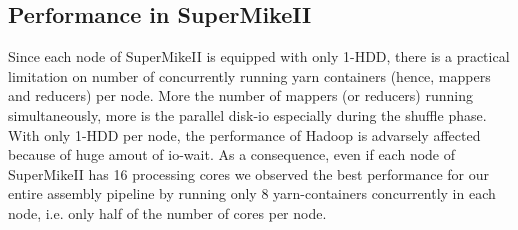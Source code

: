 \documentclass[conference]{IEEEtran}
\begin{document}
\subsection {Performance in SuperMikeII}
\label{PerformanceInSuperMikeII}
Since each node of SuperMikeII is equipped with only 1-HDD, there is a practical limitation on number of concurrently running yarn containers (hence, mappers and reducers) per node. 
More the number of mappers (or reducers) running simultaneously, more is the parallel disk-io especially during the shuffle phase. 
With only 1-HDD per node, the performance of Hadoop is advarsely affected because of huge amout of io-wait.
As a consequence, even if each node of SuperMikeII has 16 processing cores we observed the best performance for our entire assembly pipeline by running only 8 yarn-containers concurrently in each node, i.e. only half of the number of cores per node.
\end{document}
